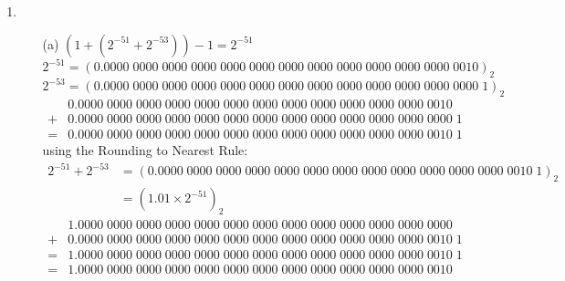 \documentclass[UTF8]{ctexart}
\begin{document}
\begin{enumerate}
\item \begin{itemize}
\item[(a)] $(1 + (2^{-51} + 2^{-53})) - 1 = 2^{-51}$ \\
$2^{-51} = (0.0000\;0000\;0000\;0000\;0000\;0000\;0000\;0000\;0000\;0000\;0000\;0000\;0010)_2$ \\
$2^{-53} = (0.0000\;0000\;0000\;0000\;0000\;0000\;0000\;0000\;0000\;0000\;0000\;0000\;0000\;1)_2$ \\
\begin{align*}
 &0.0000\;0000\;0000\;0000\;0000\;0000\;0000\;0000\;0000\;0000\;0000\;0000\;0010 \\
+&0.0000\;0000\;0000\;0000\;0000\;0000\;0000\;0000\;0000\;0000\;0000\;0000\;0000\;1 \\
\hline
=&0.0000\;0000\;0000\;0000\;0000\;0000\;0000\;0000\;0000\;0000\;0000\;0000\;0010\;1 
\end{align*}
using the Rounding to Nearest Rule:
\begin{align*}
2^{-51} + 2^{-53} &= (0.0000\;0000\;0000\;0000\;0000\;0000\;0000\;0000\;0000\;0000\;0000\;0000\;0010\;1)_2 \\
                  &= (1.01 \times 2^{-51})_2
\end{align*}
\begin{align*}
 &1.0000\;0000\;0000\;0000\;0000\;0000\;0000\;0000\;0000\;0000\;0000\;0000\;0000 \\
+&0.0000\;0000\;0000\;0000\;0000\;0000\;0000\;0000\;0000\;0000\;0000\;0000\;0010\;1 \\
\hline
=&1.0000\;0000\;0000\;0000\;0000\;0000\;0000\;0000\;0000\;0000\;0000\;0000\;0010\;1 \\
=&1.0000\;0000\;0000\;0000\;0000\;0000\;0000\;0000\;0000\;0000\;0000\;0000\;0010
\end{align*}


\end{itemize}
\end{enumerate}
\end{document}
